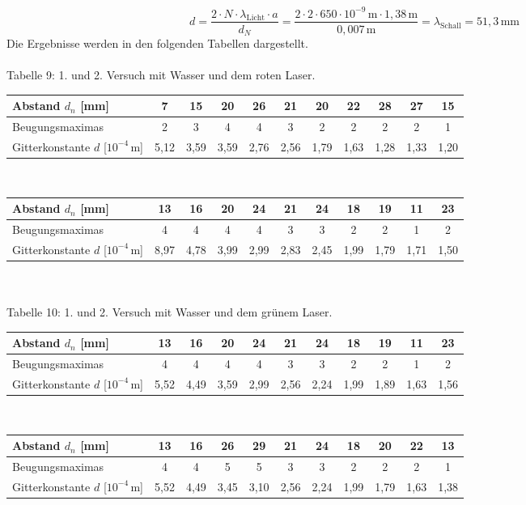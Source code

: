 \documentclass[fontsize=12pt]{scrartcl}
\begin{document}
\begin{equation*}
d=\frac{2 \cdot N \cdot \lambda_{\text{Licht}}\cdot a}{d_N}=\frac{2 \cdot 2 \cdot 650 \cdot 10^{-9}\,{\text{m}} \cdot 1,38\,{\text{m}}}{0,007\,{\text{m}}}=\lambda_{\text{Schall}} = 51,3\,\text{mm}
\end{equation*}
\noindent
Die Ergebnisse werden in den folgenden Tabellen dargestellt. \\
~\\
Tabelle 9: 1. und 2. Versuch mit Wasser und dem roten Laser. \\
\begin{tabular}{|l|c|c|c|c|c|c|c|c|c|c|} \hline
Abstand $d_n$ [mm] & 7 & 15 & 20 & 26 & 21 & 20 & 22 & 28 & 27 & 15 \\ \hline
Beugungsmaximas & 2 & 3 & 4 & 4 & 3 & 2 & 2 & 2 & 2 & 1 \\ \hline 
Gitterkonstante $d$ [$10^{-4}$\,m] & 5,12 & 3,59 & 3,59 & 2,76 & 2,56 & 1,79 & 1,63 & 1,28 & 1,33 & 1,20 \\ \hline
\end{tabular}\\
\begin{tabular}{|l|c|c|c|c|c|c|c|c|c|c|} \hline
Abstand $d_n$ [mm] & 13 & 16 & 20 & 24 & 21 & 24 & 18 & 19 & 11 & 23 \\ \hline
Beugungsmaximas & 4 & 4 & 4 & 4 & 3 & 3 & 2 & 2 & 1 & 2 \\ \hline 
Gitterkonstante $d$ [$10^{-4}$\,m] & 8,97 & 4,78 & 3,99 & 2,99 & 2,83 & 2,45 & 1,99 & 1,79 & 1,71 & 1,50 \\ \hline 
\end{tabular} \\
~\\
Tabelle 10: 1. und 2. Versuch mit Wasser und dem grünem Laser. \\
\begin{tabular}{|l|c|c|c|c|c|c|c|c|c|c|} \hline
Abstand $d_n$ [mm] & 13 & 16 & 20 & 24 & 21 & 24 & 18 & 19 & 11 & 23 \\ \hline
Beugungsmaximas & 4 & 4 & 4 & 4 & 3 & 3 & 2 & 2 & 1 & 2 \\ \hline 
Gitterkonstante $d$ [$10^{-4}$\,m] & 5,52 & 4,49 & 3,59 & 2,99 & 2,56 & 2,24 & 1,99 & 1,89 & 1,63 & 1,56 \\ \hline 
\end{tabular} \\
\begin{tabular}{|l|c|c|c|c|c|c|c|c|c|c|} \hline
Abstand $d_n$ [mm] & 13 & 16 & 26 & 29 & 21 & 24 & 18 & 20 & 22 & 13 \\ \hline
Beugungsmaximas & 4 & 4 & 5 & 5 & 3 & 3 & 2 & 2 & 2 & 1 \\ \hline 
Gitterkonstante $d$ [$10^{-4}$\,m] & 5,52 & 4,49 & 3,45 & 3,10 & 2,56 & 2,24 & 1,99 & 1,79 & 1,63 & 1,38 \\ \hline 
\end{tabular} \\
\end{document}
